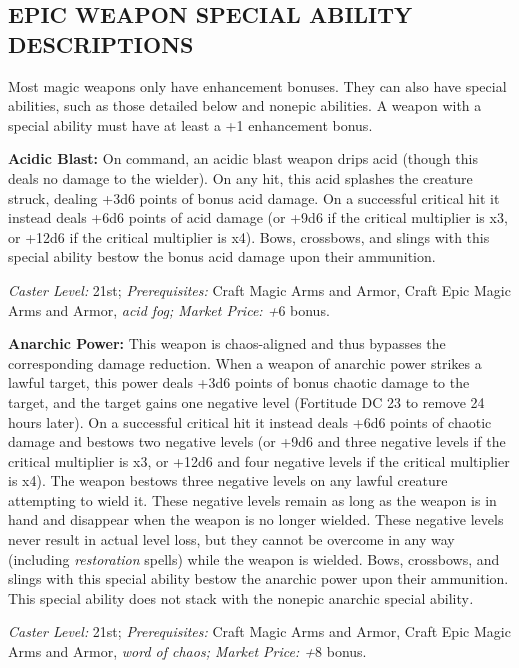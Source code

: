 \documentclass{article}
\begin{document}
\vspace{12pt}
\subsection*{EPIC WEAPON SPECIAL ABILITY DESCRIPTIONS }

Most magic weapons only have enhancement bonuses. They can also have special abilities, 
such as those detailed below and nonepic abilities.\textit{ }A weapon with a special 
ability must have at least a +1 enhancement bonus. 

\vspace{12pt}
\textbf{Acidic Blast: }On command, an acidic blast weapon drips acid (though this 
deals no damage to the wielder). On any hit, this acid splashes the creature struck, 
dealing +3d6 points of bonus acid damage. On a successful critical hit it instead 
deals +6d6 points of acid damage (or +9d6 if the critical multiplier is x3, or 
+12d6 if the critical multiplier is x4). Bows, crossbows, and slings with this 
special ability bestow the bonus acid damage upon their ammunition. 

\textit{Caster Level: }21st; \textit{Prerequisites: }Craft Magic Arms and Armor, 
Craft Epic Magic Arms and Armor, \textit{acid fog; Market Price: +}6 bonus. 

\textbf{Anarchic Power: }This weapon is chaos-aligned and thus bypasses the corresponding 
damage reduction. When a weapon of anarchic power strikes a lawful target, this 
power deals +3d6 points of bonus chaotic damage to the target, and the target gains 
one negative level (Fortitude DC 23 to remove 24 hours later). On a successful 
critical hit it instead deals +6d6 points of chaotic damage and bestows two negative 
levels (or +9d6 and three negative levels if the critical multiplier is x3, or 
+12d6 and four negative levels if the critical multiplier is x4). The weapon bestows 
three negative levels on any lawful creature attempting to wield it. These negative 
levels remain as long as the weapon is in hand and disappear when the weapon is 
no longer wielded. These negative levels never result in actual level loss, but 
they cannot be overcome in any way (including \textit{restoration }spells) while 
the weapon is wielded. Bows, crossbows, and slings with this special ability bestow 
the anarchic power upon their ammunition. This special ability does not stack with 
the nonepic anarchic special ability\textit{. }

\textit{Caster Level: }21st; \textit{Prerequisites: }Craft Magic Arms and Armor, 
Craft Epic Magic Arms and Armor, \textit{word of chaos; Market Price: +}8 bonus. 
\end{document}
